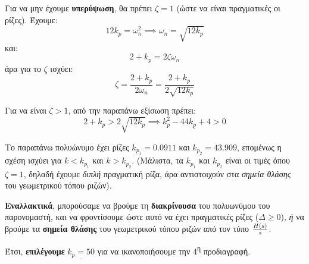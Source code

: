 \documentclass[11pt,a4paper,notitlepage,fleqn]{article}
\begin{document}
\begin{exercise}
\begin{itemize}
	Για να μην έχουμε \textbf{υπερύψωση}, θα πρέπει \( ζ = 1 \) (ώστε να είναι πραγματικές
	οι ρίζες). Έχουμε:
	\[
		12k_p = \omega_n^2
		\implies \omega_n = \sqrt{12 k_p}
	\]
	και:
	\[
	2+k_p = 2ζ\omega_n
	\]
	άρα για το \( ζ \) ισχύει:
	\[
	ζ = \frac{2+k_p}{2\omega_n} = \frac{2+k_p}{2\sqrt{12k_p}}
	\]
	
	Για να είναι \( ζ>1 \), από την παραπάνω εξίσωση πρέπει:
	\[
	2+k_p > 2\sqrt{12k_p} \implies \underline{k_p^2-44k_p+4 > 0}
	\]
	
	Το παραπάνω πολυώνυμο έχει ρίζες \( k_{p_1} = 0.0911 \) και \( k_{p_2} = 43.909 \),
	επομένως η σχέση ισχύει για \( k < k_{p_1} \) και \( k > k_{p_2} \). (Μάλιστα, τα
	\( k_{p_1} \) και \( k_{p_2} \) είναι οι τιμές όπου \( ζ=1 \), δηλαδή έχουμε \textit{διπλή} πραγματική ρίζα, άρα αντιστοιχούν στα \textit{σημεία θλάσης} του
	γεωμετρικού τόπου ριζών).
	
	\textbf{Εναλλακτικά}, μπορούσαμε να βρούμε τη \textbf{διακρίνουσα} του πολυωνύμου
	του παρονομαστή, και να φροντίσουμε ώστε αυτό να έχει πραγματικές ρίζες (\( Δ\geq0 \)),
	\textit{ή} να βρούμε τα \textbf{σημεία θλάσης} του γεωμετρικού τόπου ριζών από τον
	τύπο \( \frac{H(s)}{s} \).
	
	Έτσι, \textbf{επιλέγουμε} \( \underline{k_p = 50} \) για να ικανοποιήσουμε την 4\textsuperscript{η} προδιαγραφή.
\end{itemize}

\hspace{0pt}
\end{exercise}
\end{document}

